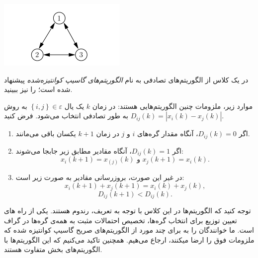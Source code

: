 \documentclass[12pt]{article} %
\begin{document}
		\begin{center}
			\includegraphics[width=0.35\linewidth]{3.png}
		\end{center}
			
			در
			 \cite{bib13}
			 یک کلاس از الگوریتم‌های تصادفی به نام
			 \textit{الگوریتم‌های گاسیپ کوانتیزه‌شده} 
			 پیشنهاد شده است؛
			  \cite{bib06} 
			 را نیز ببینید.
			  
			  موارد زیر، ملزومات چنین الگوریتم‌هایی هستند: در زمان 
			  $k$
			  یک یال 
			  $\left\{ i, j \right\} \in \varepsilon$ 
			  به روش
			  به طور تصادفی انتخاب می‌شود.
			  فرض کنید 
			$D_{ij}(k)=\left| x_{i}(k)-x_{j}(k) \right|$.
			
			\begin{enumerate}
				\item اگر
				$D_{ij}(k)=0$، 
				آنگاه مقدار گره‌های 
				$i$ 
				و 
				$j$ 
				در زمان 
				$k+1$ 
				یکسان باقی می‌مانند. 
				
				\item اگر
				$D_{ij}(k)=1$، 
				آنگاه مقادیر مطابق زیر جابجا می‌شوند:
				\begin{equation}
					x_{i}(k+1)=x_(j)(k) \text{ و } x_{j}(k+1)=x_{i}(k).
				\end{equation}
				
				\item در غیر این صورت، بروزرسانی مقادیر به صورت زیر است:
				\begin{equation*}
					x_{i}(k+1)+x_{j}(k+1)=x_{i}(k)+x_{j}(k),
				\end{equation*}
				\begin{equation*}
					D_{ij}(k+1)< D_{ij}(k).
				\end{equation*}
			\end{enumerate}
		
		توجه کنید که الگوریتم‌ها در این کلاس با توجه به تعریف، رندوم هستند. یکی از راه های تعیین توزیع برای انتخاب گره‌ها، تخصیص احتمالات مثبت به همه‌ی گره‌ها در گراف است. ما خوانندگان را به 
		\cite{bib13} 
		برای چند مورد از الگوریتم‌های صریح گاسیپ کوانتیزه شده که ملزومات فوق را ارضا میکنند، ارجاع می‌هیم. همچنین تاکید می‌کنیم که این الگوریتم‌ها با الگوریتم‌های بخش 
		متفاوت هستند.
		
\end{document}
